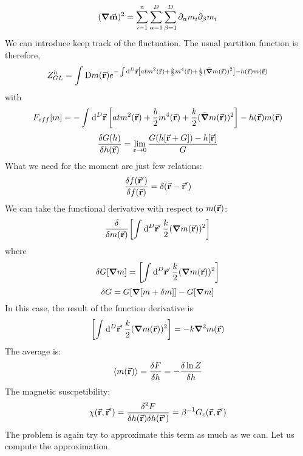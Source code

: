 \documentclass[../main/main.tex]{subfiles}
\begin{document}
\begin{equation}
  (\grad \va{m})^2 = \sum_{i=1}^{n} \sum_{\alpha =1}^{D} \sum_{\beta =1}^{D} \partial_ \alpha {m_i} \partial_ \beta  {m_i}
\end{equation}
We can introduce keep track of the fluctuation.
The usual partition function is therefore,
\begin{equation}
  Z_{GL}^h = \int_{}^{} \text{D} m(\va{r}) e^{  -\int_{}^{} \dd[D]{\va{r}} \qty[a t m^2 (\va{r}) + \frac{b}{2} m^4 (\va{r}) + \frac{k}{2} (\bar{\grad } m (\va{r}))^2] - h(\va{r})m(\va{r})  }
\end{equation}
with
\begin{equation}
  F_{eff}[m] = -\int_{}^{} \dd[D]{\va{r}} \qty[a t m^2 (\va{r}) + \frac{b}{2} m^4 (\va{r}) + \frac{k}{2} (\bar{\grad } m (\va{r}))^2] - h(\va{r})m(\va{r})
\end{equation}
\begin{equation}
  \frac{\delta G(h)}{\delta h (\va{r})} = \lim_{\varepsilon \rightarrow 0} \frac{G(h[\va{r}+G])-h[\va{r}]}{G}
\end{equation}
What we need for the moment are just few relations:
\begin{equation}
  \frac{\delta f (\va{r}')}{\delta f (\va{r})} = \delta (\va{r}-\va{r}')
\end{equation}
We can take the functional derivative with respect to \( m(\va{r}) \):
\begin{equation}
  \frac{\delta }{\delta m(\va{r})} \qty[ \int_{}^{} \dd[D]{\va{r}'} \frac{k}{2} ( \grad m(\va{r}))^2  ]
\end{equation}
where
\begin{equation}
  \delta G [ \grad m] = \qty[ \int_{}^{} \dd[D]{\va{r}'} \frac{k}{2} ( \grad m(\va{r}))^2  ]
\end{equation}
\begin{equation}
  \delta G = G \qty[ \grad [m+\delta m]] - G [\grad m]
\end{equation}
In this case, the result of the function derivative is
\begin{equation}
  \qty[ \int_{}^{} \dd[D]{\va{r}'} \frac{k}{2} ( \grad m(\va{r}))^2  ] = - k \grad ^2 m(\va{r})
\end{equation}
The average is:
\begin{equation}
  \expval{m(\va{r})} = \frac{\delta F}{\delta h} = - \frac{\delta \ln{Z} }{\delta h}
\end{equation}
The magnetic suscpetibility:
\begin{equation}
  \chi  (\va{r},\va{r}') = \frac{\delta ^2 F}{\delta h(\va{r}) \delta h(\va{r}')} = \beta ^{-1} G_c (\va{r},\va{r}')
\end{equation}
The problem is again try to approximate this term as much as we can.
Let us compute the approximation.
\end{document}
